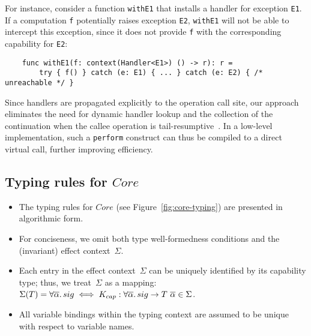 \documentclass[acmsmall]{acmart}
\newcommand{\ap}{~}
\begin{document}
For instance, consider a function \texttt{withE1} that installs a handler for exception \texttt{E1}.
If a computation \texttt{f} potentially raises exception \texttt{E2}, \texttt{withE1} will not be able to intercept this exception, since it does not provide \texttt{f} with the corresponding capability for \texttt{E2}:
\begin{verbatim}
    func withE1(f: context(Handler<E1>) () -> r): r =
        try { f() } catch (e: E1) { ... } catch (e: E2) { /* unreachable */ }
\end{verbatim}

Since handlers are propagated explicitly to the operation call site, our approach eliminates the need for dynamic handler lookup and the collection of the continuation when the callee operation is tail-resumptive~\cite{xie2020effect}.
In a low-level implementation, such a \texttt{perform} construct can thus be compiled to a direct virtual call, further improving efficiency. %


\subsection{Typing rules for $Core$}

\begin{itemize}
    \item The typing rules for $Core$ (see Figure~\ref{fig:core-typing}) are presented in algorithmic form.
    \item For conciseness, we omit both type well-formedness conditions and the (invariant) effect context~$\Sigma$.
    \item Each entry in the effect context~$\Sigma$ can be uniquely identified by its capability type; thus, we treat~$\Sigma$ as a mapping: $\Sigma(T) = \forall\overline{\alpha}\ldotp sig \iff K_{cap} : \forall\overline{\alpha}\ldotp sig\to T\ap\overline{\alpha}\in\Sigma$.
    \item All variable bindings within the typing context are assumed to be unique with respect to variable names.
\end{itemize}
\end{document}

